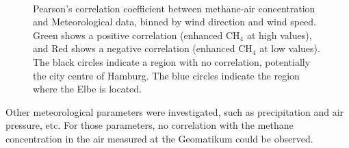 \begin{figure}[t!]
    \hfill
    \\
    \hfill
    \caption[Correlation between CH$_4$ and meteorological data]{Pearson's correlation coefficient between methane-air concentration and Meteorological data, binned by wind direction and wind speed. Green shows a positive correlation (enhanced CH$_4$ at high values), and Red shows a negative correlation (enhanced CH$_4$ at low values). The black circles indicate a region with no correlation, potentially the city centre of Hamburg. The blue circles indicate the region where the Elbe is located.}
    \label{CorrelationMeteorological}
\end{figure}
Other meteorological parameters were investigated, such as precipitation and air pressure, etc. For those parameters, no correlation with the methane concentration in the air measured at the Geomatikum could be observed.

